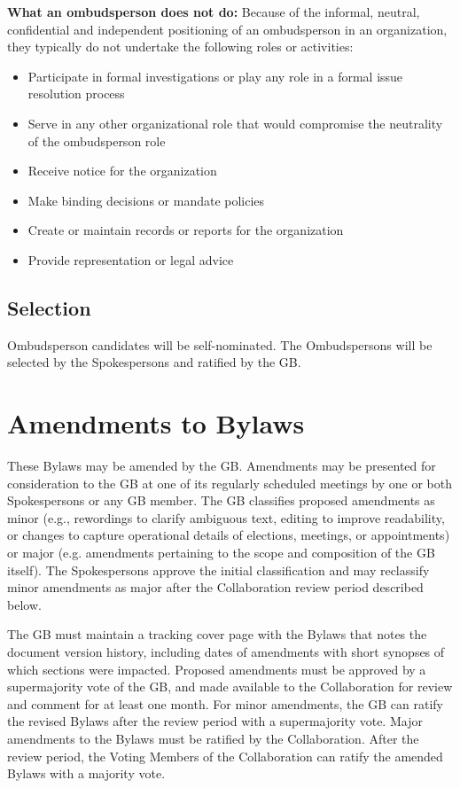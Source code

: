 \documentclass[12pt]{article}
\begin{document}
{\bf What an ombudsperson does not do:} Because of the informal, neutral, confidential and independent positioning of an ombudsperson
in an organization, they typically do not undertake the following roles or activities:
\begin{itemize}
\item Participate in formal investigations or play any role in a formal issue resolution process
\item Serve in any other organizational role that would compromise the neutrality of the
ombudsperson role
\item Receive notice for the organization
\item Make binding decisions or mandate policies
\item Create or maintain records or reports for the organization
\item Provide representation or legal advice

\end{itemize}

\subsection{Selection}
Ombudsperson candidates will be self-nominated.  The Ombudspersons will be selected by the Spokespersons and ratified by the GB.


\section{Amendments to Bylaws}
\label{sec:amend}
These Bylaws may be amended by the GB. \textcolor{\markcolor} {Amendments may be presented for consideration to the GB at one of its regularly scheduled meetings by one or both Spokespersons or any GB member.
The GB  classifies proposed amendments as minor (e.g., rewordings to clarify ambiguous text, editing to improve readability, or changes to capture operational details of elections, meetings, or appointments) or major (e.g. amendments pertaining to the scope and composition of the GB itself).  The Spokespersons approve the initial classification and may reclassify minor amendments as major after the Collaboration review period described below.}

\textcolor{\markcolor}{
The GB must  maintain a tracking cover page with the Bylaws that notes the document version history, including dates of amendments with short synopses of which sections were impacted.  Proposed amendments must be approved by a supermajority vote of the GB, and made available to the Collaboration for review and comment for at least one month.  
For minor amendments, the GB can  ratify the revised Bylaws after the review period with a supermajority vote. Major amendments to the Bylaws must be ratified by the Collaboration. After the review period, the Voting Members of the Collaboration can  ratify the amended Bylaws with a majority vote. }
\end{document}

